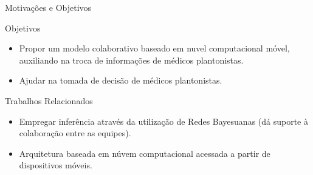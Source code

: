 \documentclass{beamer}
\begin{document}
\begin{frame}{Motivações e Objetivos}
    \begin{block}{Objetivos}
      \begin{itemize}
        \item Propor um modelo colaborativo baseado em nuvel computacional móvel, auxiliando na troca de informações de médicos plantonistas.
        \item Ajudar na tomada de decisão de médicos plantonistas.
    \end{itemize}
  \end{block}
  \vskip 1cm
  \begin{block}{Trabalhos Relacionados}
    \begin{itemize}
        \item Empregar inferência através da utilização de Redes Bayesuanas (dá suporte à colaboração entre as equipes).
        \item Arquitetura baseada em núvem computacional acessada a partir de dispositivos móveis.
    \end{itemize}
  \end{block}
\end{frame}
\end{document}
